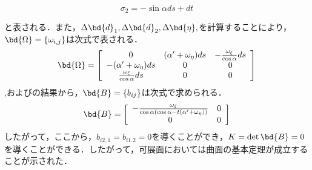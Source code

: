 		\begin{equation}\label{eq::Dev_sigmaEq_t}
			\sigma_2 = -\sin \alpha ds + dt
		\end{equation}
		
		と表される．また，$ \Delta \bd{d}_1, \Delta \bd{d}_2, \Delta \bd{\eta},$を計算することにより，$ \bd{\Omega} = \{\omega_{i,j}\} $は次式で表される．
		\begin{equation}\label{eq:Dev_OmegaEq}
			\bd{\Omega} = \left[ \begin{array}{ccc}
				0 & (\alpha' + \omega_{\eta})ds & -\frac{\omega_{\xi} }{\cos \alpha} ds \\
				-(\alpha' + \omega_{\eta})ds & 0 & 0\\
				\frac{\omega_{\xi} }{\cos \alpha} ds & 0 & 0 
			\end{array}\right]
		\end{equation}
		,およびの結果から，$ \bd{B} = \{ b_{ij} \} $は次式で求められる．
		\begin{equation}\label{eq:beq}
			\bd{B} = \left[
				\begin{array}{cc}
					-\frac{\omega_{\xi} }{\cos \alpha  (\cos \alpha - t(\alpha' + \omega_{\eta}) ) } & 0 \\
					0 & 0
				\end{array}
			\right]
		\end{equation}
		したがって，ここから，$ b_{i2,1} = b_{i1.2} =0 $を導くことができ，$ K = \det \bd{B} = 0 $を導くことができる．したがって，可展面においては曲面の基本定理が成立することが示された．